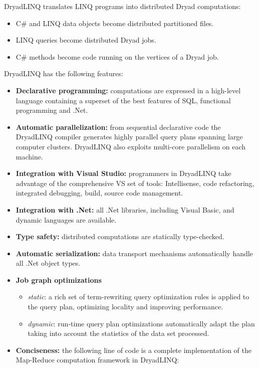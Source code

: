 \documentclass[twocolumn]{article}
\begin{document}
DryadLINQ translates LINQ programs into distributed Dryad computations:
\begin{itemize}
  \item C\# and LINQ data objects become distributed partitioned files.
  \item LINQ queries become distributed Dryad jobs.
  \item C\# methods become code running on the vertices of a Dryad job.
\end{itemize}

DryadLINQ has the following features:
\begin{itemize}
  \item {\bfseries Declarative programming:} computations are expressed in a high-level language containing a superset of the best features of SQL, functional programming and .Net.
  \item {\bfseries Automatic parallelization:} from sequential declarative code the DryadLINQ compiler generates highly parallel query plans spanning large computer clusters. DryadLINQ also exploits multi-core parallelism on each machine.
  \item {\bfseries Integration with Visual Studio:} programmers in DryadLINQ take advantage of the comprehensive VS set of tools: Intellisense, code refactoring, integrated debugging, build, source code management.
  \item {\bfseries Integration with .Net:} all .Net libraries, including Visual Basic, and dynamic languages are available.
  \item {\bfseries Type safety:} distributed computations are statically type-checked.
  \item {\bfseries Automatic serialization:} data transport mechanisms automatically handle all .Net object types.
  \item {\bfseries Job graph optimizations}
	\begin{itemize}
		\item \emph{static}: a rich set of term-rewriting query optimization rules is applied to the query plan, optimizing locality and improving performance.
		\item \emph{dynamic}: run-time query plan optimizations automatically adapt the plan taking into account the statistics of the data set processed.
	\end{itemize}
  \item {\bfseries Conciseness:} the following line of code is a complete implementation of the Map-Reduce computation framework in DryadLINQ:
\end{itemize}
\end{document}
